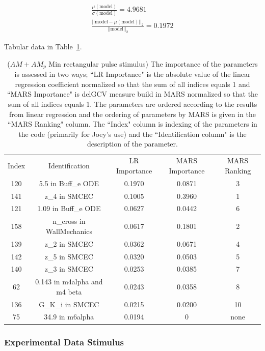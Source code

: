 \documentclass[12pt]{article}
\numberwithin{equation}{section}
\begin{document}
\begin{eqnarray*}
\frac{\mu(\text{model})}{\sigma(\text{model})} = 4.9681\\
\frac{\vert \vert \text{model}-\mu(\text{model}) \vert \vert_2 }{\vert \vert \text{model}\vert \vert_2 } = 0.1972
\end{eqnarray*}

Tabular data in Table~\ref{qoi_AM_AMp_Min_rec}.

 
\begin{table}[h]
\centering
\begin{tabular}{ccccc}
Index & Identification & LR Importance & MARS Importance & MARS Ranking \\
120 & 5.5 in Buff\_e ODE & 0.1970 & 0.0871 & 3\\
141 & z\_4 in SMCEC & 0.1005 & 0.3960 & 1\\
121 & 1.09 in Buff\_e ODE & 0.0627 & 0.0442 & 6\\
158 & n\_cross in WallMechanics & 0.0617 & 0.1801 & 2\\
139 & z\_2 in SMCEC & 0.0362 & 0.0671 & 4\\
142 & z\_5 in SMCEC & 0.0320 & 0.0503 & 5\\
140 & z\_3 in SMCEC & 0.0253 & 0.0385 & 7\\
62 & 0.143 in m4alpha and m4 beta & 0.0243 & 0.0358 & 8\\
136 & G\_K\_i in SMCEC & 0.0215 & 0.0200 & 10\\
75 & 34.9 in m6alpha & 0.0194 & 0 & none\\
\end{tabular}
\caption{($AM+AM_p$ Min rectangular pulse stimulus) The importance of the parameters is assessed in two ways; ``LR Importance" is the absolute value of the linear regression coefficient normalized so that the sum of all indices equals 1 and ``MARS Importance" is delGCV measure build in MARS normalized so that the sum of all indices equals 1. The parameters are ordered according to the results from linear regression and the ordering of parameters by MARS is given in the ``MARS Ranking" column. The ``Index" column is indexing of the parameters in the code (primarily for Joey's use) and the ``Identification column" is the description of the parameter.}
\label{qoi_AM_AMp_Min_rec}
\end{table}

\newpage

\subsubsection{Experimental Data Stimulus}
\end{document}
